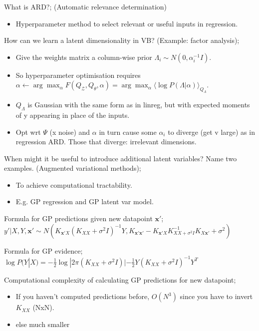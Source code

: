 \documentclass{article}
\begin{document}
What is ARD?; (Automatic relevance determination) \begin{itemize} \item Hyperparameter method to select relevant or useful inputs in regression.  \end{itemize} 

How can we learn a latent dimensionality in VB? (Example: factor analysis); \begin{itemize} \item Give the weights matrix a column-wise prior $\Lambda_i \sim N(0, \alpha_i^{-1}I)$.  \item So hyperparameter optimisation requires $\alpha \leftarrow \arg\max_{\alpha} F(Q_\mathcal{Z}, Q_\theta, \alpha) = \arg\max_\alpha \langle \log P(\Lambda |\alpha)\rangle_{Q_\Lambda}$.  \item $Q_\Lambda$ is Gaussian with the same form as in linreg, but with expected moments of y appearing in place of the inputs.  \item Opt wrt $\Psi$ (x noise) and $\alpha$ in turn cause some $\alpha_i$ to diverge (get v large) as in regression ARD. Those that diverge: irrelevant dimensions.  \end{itemize}

When might it be useful to introduce additional latent variables? Name two examples. (Augmented variational methods); \begin{itemize} \item To achieve computational tractability.  \item E.g. GP regression and GP latent var model.  \end{itemize}


Formula for GP predictions given new datapoint $\mathbf{x'}$; $y'|X, Y, \mathbf{x'} \sim N(K_{\mathbf{x'}X}(K_{XX}+\sigma^2I)^{-1}Y, K_{\mathbf{x'x'}}-K_{\mathbf{x'}X}K_{XX+\sigma^2I}^{-1}K_{X\mathbf{x'}}+\sigma^2)$

Formula for GP evidence; $\log P(Y|X) = -\frac{1}{2}\log|2\pi(K_{XX}+\sigma^2I)|-\frac{1}{2}Y(K_{XX}+\sigma^2I)^{-1}Y^T$ 

Computational complexity of calculating GP predictions for new datapoint; \begin{itemize}
    \item If you haven't computed predictions before, $O(N^3)$ since you have to invert $K_{XX}$ (NxN).
    \item else much smaller
\end{itemize}
\end{document}
